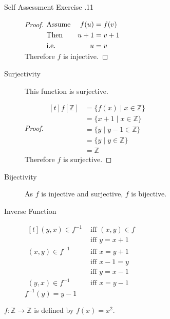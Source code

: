 \documentclass[\main/notes.tex]{subfiles}
\begin{document}
\begin{exercise}{Self Assessment Exercise \thechapter.11}
\begin{questions}
\begin{questions}
\begin{answer}
\begin{description}
											\begin{proof}
												$ 
												\begin{alignedat}[t]{2}
													& \text{Assume} \quad &f(u) &= f(v)\\
													& \text{Then} & u + 1 &= v + 1\\
													& \text{i.e.} & u &= v
												\end{alignedat}
												$\\
												Therefore $f$ is injective.
											\end{proof}
										\pagebreak
										\item[Surjectivity] This function is surjective.
											\begin{proof}
												$
												\begin{aligned}[t]
													f[\mathbb{Z}] &= \{f(x) \mid x \in \mathbb{Z}\}\\
													&= \{x + 1 \mid x \in \mathbb{Z}\}\\
													&= \{y \mid y - 1 \in \mathbb{Z}\}\\
													&= \{y \mid y \in \mathbb{Z}\}\\
													&= \mathbb{Z}
												\end{aligned} $\\
												Therefore $f$ is surjective.
											\end{proof}
										\item[Bijectivity] As $f$ is injective and surjective, $f$ is bijective.
										\item[Inverse Function] $
												\begin{aligned}[t]
													(y, x) \in f^{-1} &\text{ iff } (x, y) \in f\\
													&\text{ iff } y = x + 1\\
													(x, y) \in f^{-1} &\text{ iff } x = y + 1\\
													&\text{ iff } x - 1 = y\\
													&\text{ iff } y = x - 1\\
													(y, x) \in f^{-1} &\text{ iff } x = y - 1
												\end{aligned} $\\
											$f^{-1}(y) = y - 1$
									\end{description}
								\end{answer}
							\item $f: \mathbb{Z} \rightarrow \mathbb{Z}$ is defined by $f(x) = x^{2}$.

\end{questions}
\end{questions}
\end{exercise}
\end{document}
